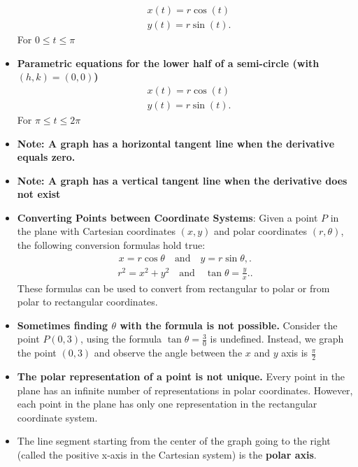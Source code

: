 \documentclass{report}
\begin{document}
\begin{itemize}
            \begin{align*}
                &x(t) = r\cos{(t)} \\
                &y(t) = r\sin{(t)}
            .\end{align*}
            For $0 \leq t \leq \pi $
        \item \textbf{Parametric equations for the lower half of a semi-circle (with $(h,k) = (0,0)$)}
            \begin{align*}
                &x(t) = r\cos{(t)} \\
                &y(t) = r\sin{(t)}
            .\end{align*}
            For $\pi \leq t \leq 2\pi $
        \item \textbf{Note: A graph has a horizontal tangent line when the derivative equals zero.}
        \item \textbf{Note: A graph has a vertical tangent line when the derivative does not exist}
        \item \textbf{Converting Points between Coordinate Systems}: 
            Given a point \( P \) in the plane with Cartesian coordinates \((x, y)\) and polar coordinates \((r, \theta)\), the following conversion formulas hold true:
            \begin{align*}
                x = r \cos \theta \quad \text{and} \quad y = r \sin \theta,
            .\end{align*}
            \begin{align*}
                r^2 = x^2 + y^2 \quad \text{and} \quad \tan \theta = \frac{y}{x}.
            .\end{align*}
            These formulas can be used to convert from rectangular to polar or from polar to rectangular coordinates.
        \item \textbf{Sometimes finding $\theta$ with the formula is not possible.} Consider the point $P(0,3)$, using the formula $\tan{\theta } = \frac{3}{0}$ is undefined. Instead, we graph the point $(0,3)$ and observe the angle between the $x$ and $y$ axis is $\frac{\pi}{2}$ 
        \item \textbf{The polar representation of a point is not unique.} Every point in the plane has an infinite number of representations in polar coordinates. However, each point in the plane has only one representation in the rectangular coordinate system.
        \item The line segment starting from the center of the graph going to the right (called the positive x-axis in the Cartesian system) is the \textbf{polar axis}. 

\end{itemize}
\end{document}
